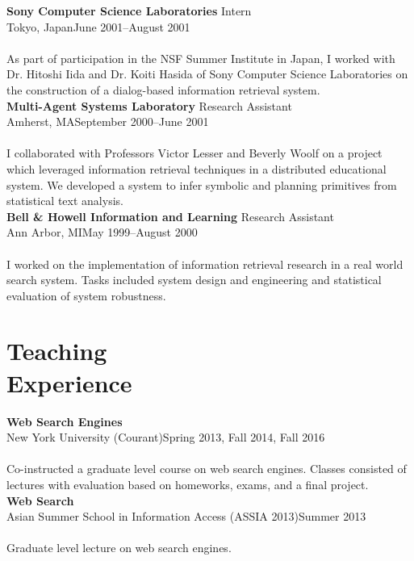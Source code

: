 \documentclass{article}
\begin{document}
\noindent\textbf{Sony Computer Science Laboratories }\hfill Intern\\
Tokyo, Japan\hfill  June 2001–August 2001\\\\
As part of participation in the NSF Summer Institute in Japan, I worked with Dr. Hitoshi Iida and Dr. Koiti Hasida of Sony Computer Science Laboratories on the construction of a dialog-based information retrieval system.\\

\noindent\textbf{Multi-Agent Systems Laboratory }\hfill Research Assistant\\
Amherst, MA\hfill  September 2000–June 2001\\\\
I collaborated with Professors Victor Lesser and Beverly Woolf on a project which leveraged information retrieval techniques in a distributed educational system. We developed a system to infer symbolic and planning primitives from statistical text analysis.\\

\noindent\textbf{Bell \& Howell Information and Learning }\hfill Research Assistant\\
Ann Arbor, MI\hfill  May 1999–August 2000\\\\
I worked on the implementation of information retrieval research in a real world search system. Tasks included system design and engineering and statistical evaluation of system robustness.\\


\section{Teaching \\Experience}\noindent\textbf{Web Search Engines} \\
New York University (Courant)\hfill Spring 2013, Fall 2014, Fall 2016\\\\
Co-instructed a graduate level course on web search engines.  Classes consisted of lectures with evaluation based on homeworks, exams, and a final project. \\

\noindent\textbf{Web Search} \\
Asian Summer School in Information Access (ASSIA 2013)\hfill Summer 2013\\\\
Graduate level lecture on web search engines.  \\
\end{document}
